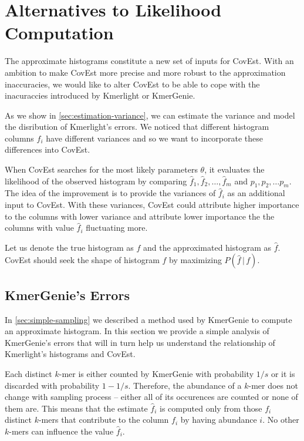 \section{Alternatives to Likelihood Computation}
The approximate histograms constitute a new set of inputs for CovEst.
With an ambition to make CovEst more precise and more robust to the approximation inaccuracies,
we would like to alter CovEst to be able to cope with the inacuraccies introduced by
Kmerlight or KmerGenie.

As we show in \ref{sec:estimation-variance}, we can estimate the variance and 
model the disribution of Kmerlight's errors. We noticed that different histogram columns $f_i$
have different variances and so we want to incorporate these differences into CovEst.

When CovEst searches for the most likely parameters $\theta$, it evaluates the likelihood
of the observed histogram by comparing $\hat f_1, \hat f_2, \dots, \hat f_m$ and 
$p_1, p_2, \dots p_m$. The idea of the improvement is to provide the variances of 
$\hat f_i$ as an additional input to CovEst. With these variances, CovEst could
attribute higher importance to the columns with lower variance and attribute
lower importance the the columns with value $\hat f_i$ fluctuating more.

Let us denote the true histogram as $f$ and the approximated histogram as $\hat f$.
CovEst should seek the shape of histogram $f$ by maximizing $P(\hat f \,|\, f)$. 

\subsection{KmerGenie's Errors}
\label{sec:kmergenie-errors}
In \ref{sec:simple-sampling} we described a method used by KmerGenie to compute 
an approximate histogram. In this section we provide a simple analysis of KmerGenie's
errors that will in turn help us understand the relationship of Kmerlight's histograms
and CovEst.

Each distinct $k$-mer is either counted by KmerGenie with probability $1/s$ or it is discarded 
with probability $1 - 1/s$. Therefore, the abundance of a $k$-mer does not change 
with sampling process -- either all of its occurences are counted or none of them are.
This means that the estimate $\hat f_i$ is computed only from those $f_i$ distinct $k$-mers 
that contribute to the column $f_i$ by having abundance $i$. No other $k$-mers can
influence the value $\hat f_i$.

